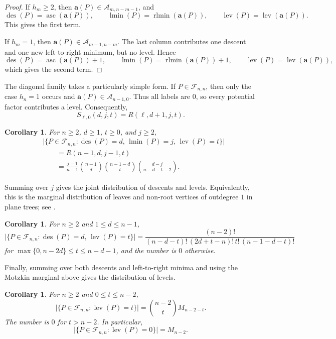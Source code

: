 \documentclass[12pt]{amsart}
\theoremstyle{plain}
\newtheorem{coro}[theorem]{Corollary}
\theoremstyle{definition}
\DeclareMathOperator{\des}{des}
\newcommand{\F}{{\mathcal F}}
\DeclareMathOperator{\lev}{lev}
\DeclareMathOperator{\asc}{asc}
\DeclareMathOperator{\rlmin}{rlmin}
\DeclareMathOperator{\lmin}{lmin}
\begin{document}
\begin{proof}
If $h_m\geq2$, then $\mathbf a(P)\in\mathcal A_{m,n-m-1}$, and
\[
\des(P)=\asc(\mathbf a(P)),
\qquad
\lmin(P)=\rlmin(\mathbf a(P)),
\qquad
\lev(P)=\lev(\mathbf a(P)).
\]
This gives the first term.

If $h_m=1$, then $\mathbf a(P)\in\mathcal A_{m-1,n-m}$. The last column contributes one descent and one new left-to-right
minimum, but no level. Hence
\[
\des(P)=\asc(\mathbf a(P))+1,
\qquad
\lmin(P)=\rlmin(\mathbf a(P))+1,
\qquad
\lev(P)=\lev(\mathbf a(P)),
\]
which gives the second term.
\end{proof}

The diagonal family takes a particularly simple form. If
$P\in\F_{n,n}$, then only the case $h_n=1$ occurs and
$\mathbf a(P)\in\mathcal A_{n-1,0}$. Thus all labels are $0$, so every
potential factor contributes a level. Consequently,
\[
S_{\ell,0}(d,j,t)
=
R(\ell,d+1,j,t).
\]

\begin{coro}
For $n\geq2$, $d\geq1$, $t\geq0$, and $j\geq2$,
\begin{align*}
&\bigl|
\{P\in\F_{n,n}:
\des(P)=d,\,
\lmin(P)=j,\,
\lev(P)=t\}
\bigr|\\
&\qquad = R(n-1,d,j-1,t)\\
&\qquad =
\frac{j-1}{n-1}
\binom{n-1}{d}
\binom{n-1-d}{t}
\binom{d-j}{n-d-t-2}.
\end{align*}
\end{coro}

Summing over $j$ gives the joint distribution of descents and levels.
Equivalently, this is the marginal distribution of leaves and non-root
vertices of outdegree $1$ in plane trees; see
\cite[Corollary~4.1.9]{KirkpatrickOnyeze}.

\begin{coro}\label{cor:diagonal-descents-levels}
For $n\geq2$ and $1\leq d\leq n-1$,
\[
\bigl|
\{P\in\F_{n,n}:
\des(P)=d,\,
\lev(P)=t\}
\bigr|
=
\frac{(n-2)!}
{(n-d-t)!\,(2d+t-n)!\,t!\,(n-1-d-t)!}
\]
for $\max\{0,n-2d\}\leq t\leq n-d-1$, and the number is $0$ otherwise.
\end{coro}

Finally, summing over both descents and left-to-right minima and using
the Motzkin marginal above gives the distribution of levels.

\begin{coro}\label{cor:levels-Motzkin}
For $n\geq2$ and $0\leq t\leq n-2$,
\[
\bigl|
\{P\in\F_{n,n}:\lev(P)=t\}
\bigr|
=
\binom{n-2}{t}M_{n-2-t}.
\]
The number is $0$ for $t>n-2$. In particular,
\[
\bigl|
\{P\in\F_{n,n}:\lev(P)=0\}
\bigr|
=
M_{n-2}.
\]
\end{coro}
\end{document}
